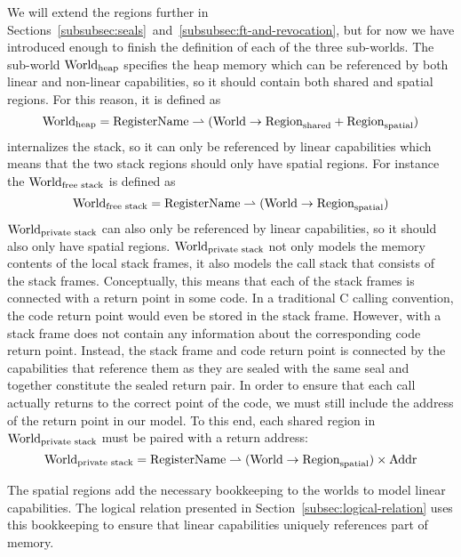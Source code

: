 \begin{jversion}
We will extend the regions further in Sections~\ref{subsubsec:seals}~and~\ref{subsubsec:ft-and-revocation}, but for now we have introduced enough to finish the definition of each of the three sub-worlds.
The sub-world $\mathrm{World}_\mathrm{heap}$ specifies the heap memory which can be referenced by both linear and non-linear capabilities, so it should contain both shared and spatial regions.
For this reason, it is defined as
\[
  \mathrm{World}_\mathrm{heap} = \mathrm{RegisterName} \rightharpoonup (\mathrm{World} \rightarrow \mathrm{Region}_\mathrm{shared} + \mathrm{Region}_\mathrm{spatial})
\]
\srccm{} internalizes the \stktokens{} stack, so it can only be referenced by linear capabilities which means that the two stack regions should only have spatial regions.
For instance the $\mathrm{World}_\text{free stack}$ is defined as
\[
  \mathrm{World}_\text{free stack} = \mathrm{RegisterName} \rightharpoonup (\mathrm{World} \rightarrow \mathrm{Region}_\mathrm{spatial})
\]
$\mathrm{World}_\text{private stack}$ can also only be referenced by linear capabilities, so it should also only have spatial regions.
$\mathrm{World}_\text{private stack}$ not only models the memory contents of the local stack frames, it also models the call stack that consists of the stack frames.
Conceptually, this means that each of the stack frames is connected with a return point in some code.
In a traditional C calling convention, the code return point would even be stored in the stack frame.
However, with \stktokens{} a stack frame does not contain any information about the corresponding code return point.
Instead, the stack frame and code return point is connected by the capabilities that reference them as they are sealed with the same seal and together constitute the sealed return pair.
In order to ensure that each call actually returns to the correct point of the code, we must still include the address of the return point in our model.
To this end, each shared region in $\mathrm{World}_\text{private stack}$ must be paired with a return address:
\[
\mathrm{World}_\text{private stack} = \mathrm{RegisterName} \rightharpoonup (\mathrm{World} \rightarrow \mathrm{Region}_\mathrm{spatial}) \times \mathrm{Addr} 
\]

The spatial regions add the necessary bookkeeping to the worlds to model linear capabilities.
The logical relation presented in Section~\ref{subsec:logical-relation} uses this bookkeeping to ensure that linear capabilities uniquely references part of memory.


\end{jversion}
